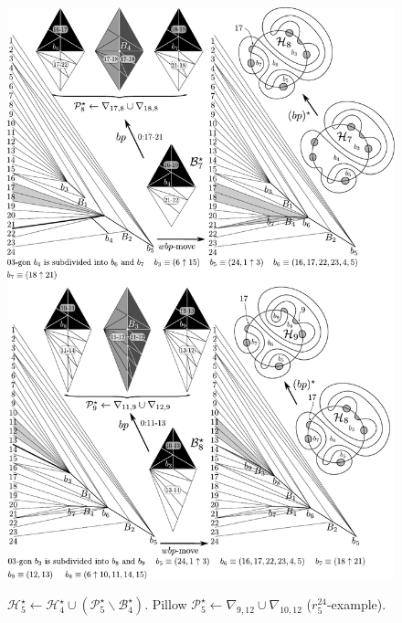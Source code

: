 \begin{figure}
\begin{center}
\includegraphics[width=15cm]{A.figs/bpandwinglist789.pdf} \\
\caption{\sf 
$\mathcal{H}^\star_{5} \leftarrow \mathcal{H}^\star_4 
\cup (\mathcal{P}_{5}^\star \backslash \mathcal{B}_4^\star)$. 
Pillow $\mathcal{P}_{5}^\star \leftarrow 
\nabla_{9,12}\cup \nabla_{10,12}$
($r^{24}_5$-example).}
\label{fig:winglist04}
\end{center}
\end{figure}

